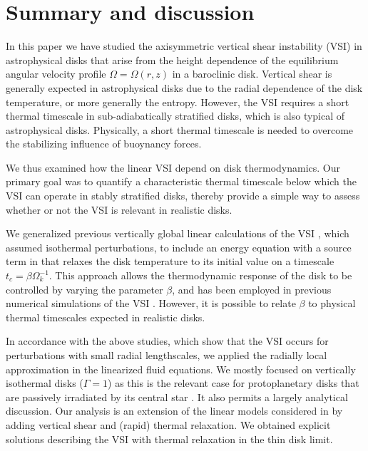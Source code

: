 \section{Summary and discussion}\label{summary}
In this paper we have studied the axisymmetric vertical shear
instability (VSI) in astrophysical disks that arise from the
height dependence of the equilibrium angular velocity profile
$\Omega=\Omega(r,z)$ in a baroclinic disk. Vertical shear is generally
expected in astrophysical disks due to the radial dependence of the
disk temperature, or more generally the entropy. However, the VSI
requires a short thermal timescale in sub-adiabatically stratified
disks, which is also typical of astrophysical disks. Physically, a
short thermal timescale is needed to overcome the stabilizing
influence of buoynancy forces.  

We thus examined how the linear VSI depend on disk
thermodynamics. Our primary goal was to quantify a characteristic
thermal timescale below which the VSI can operate in stably stratified
disks, thereby provide a simple way to assess whether or not the VSI
is relevant in realistic disks.     

We generalized previous vertically global linear 
calculations of the VSI \citep{nelson13,mcnally14,barker15}, which
assumed isothermal perturbations, to include an energy equation with %
a source term in that relaxes the disk
temperature to its initial value on a timescale
$t_c=\beta\Omega_k^{-1}$. This approach allows the thermodynamic
response of the disk to be controlled by varying the parameter
$\beta$, and has been employed in previous numerical simulations of
the VSI \citep{nelson13}. However, it is possible to 
relate  $\beta$ to physical thermal timescales expected in realistic disks.  

In accordance with the above studies, which show that the VSI occurs for 
perturbations with small radial lengthscales, we applied the 
radially local approximation in the linearized fluid equations. %
We mostly focused on vertically isothermal disks ($\Gamma=1$) as 
this is the relevant case for protoplanetary disks that are passively
irradiated by its central star \citep{chiang97}. It also permits a
largely analytical discussion. Our analysis is an extension of the
linear models considered in \cite{lubow93} by adding vertical shear
and (rapid) thermal relaxation. We obtained explicit solutions
describing the VSI with thermal relaxation in the thin disk limit.  

